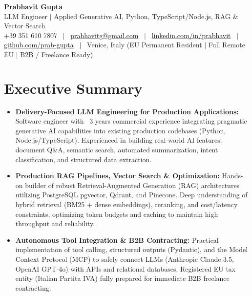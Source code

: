 \documentclass[a4paper,10pt]{article}
\begin{document}
\begin{minipage}[c]{0.80\textwidth}
  {\Huge\bfseries Prabhavit Gupta}\\[3pt]
  {\color{accent}\large LLM Engineer $\vert$ Applied Generative AI, Python, TypeScript/Node.js, RAG $\&$ Vector Search}\\[6pt]
  {\footnotesize +39 351 610 7807 ~$\vert$~
  \href{mailto:prabhavitg@gmail.com}{prabhavitg@gmail.com} ~$\vert$~
  \href{https://www.linkedin.com/in/prabhavit/}{linkedin.com/in/prabhavit} ~$\vert$~
  \href{https://github.com/prab-gupta}{github.com/prab-gupta} ~$\vert$~
  Venice, Italy (EU Permanent Resident $\vert$ Full Remote EU $\vert$ B2B / Freelance Ready)}
\end{minipage}\hfill

\vspace{6pt}

\section{Executive Summary}
\begin{itemize}
  \item \textbf{Delivery-Focused LLM Engineering for Production Applications:} Software engineer with ~3 years commercial experience integrating pragmatic generative AI capabilities into existing production codebases (Python, Node.js/TypeScript). Experienced in building real-world AI features: document Q\&A, semantic search, automated summarization, intent classification, and structured data extraction.
  \item \textbf{Production RAG Pipelines, Vector Search \& Optimization:} Hands-on builder of robust Retrieval-Augmented Generation (RAG) architectures utilizing PostgreSQL pgvector, Qdrant, and Pinecone. Deep understanding of hybrid retrieval (BM25 + dense embeddings), reranking, and cost/latency constraints, optimizing token budgets and caching to maintain high throughput and reliability.
  \item \textbf{Autonomous Tool Integration \& B2B Contracting:} Practical implementation of tool calling, structured outputs (Pydantic), and the Model Context Protocol (MCP) to safely connect LLMs (Anthropic Claude 3.5, OpenAI GPT-4o) with APIs and relational databases. Registered EU tax entity (Italian Partita IVA) fully prepared for immediate B2B freelance contracting.
\end{itemize}
\end{document}
